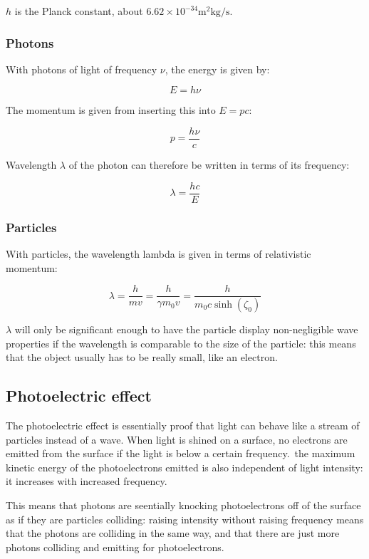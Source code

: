 \documentclass[12pt]{article}
\begin{document}
$h$ is the Planck constant, about $6.62\times 10^{-34} \text{m}^2\text{kg}/\text{s}$.

\subsubsection{Photons}

With photons of light of frequency $\nu$, the energy is given by:

\[
E = h\nu
\]

The momentum is given from inserting this into $E = pc$:

\[
p = \frac{h\nu}{c}
\]

Wavelength $\lambda$ of the photon can therefore be written in terms of its frequency:

\[
\boxed{
\lambda = \frac{hc}{E}
}
\]

\subsubsection{Particles}

With particles, the wavelength lambda is given in terms of relativistic momentum:

\[
\boxed{
\lambda = \frac{h}{mv} = \frac{h}{\gamma m_0 v} = \frac{h}{m_0 c \sinh(\zeta_0)} 
}
\]

$\lambda$ will only be significant enough to have the particle display non-negligible wave properties if the wavelength is comparable to the size of the particle: this means that the object usually has to be really small, like an electron.

\newpage

\subsection{Photoelectric effect}

The photoelectric effect is essentially proof that light can behave like a stream of particles instead of a wave.
When light is shined on a surface, no electrons are emitted from the surface if the light is below a certain frequency.\
the maximum kinetic energy of the photoelectrons emitted is also independent of light intensity: it increases with increased frequency.

This means that photons are seentially knocking photoelectrons off of the surface as if they are particles colliding: raising intensity without raising frequency means that the photons are colliding in the same way, and that there are just more photons colliding and emitting for photoelectrons.
\end{document}
